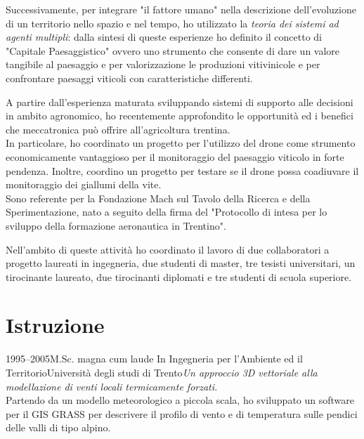 \documentclass{curriculum}
\begin{document}
\begin{description}[style= unboxed, leftmargin= 6 pt, topsep= -3 pt, parsep= 3 pt, itemsep= 2pt]
     Successivamente, per integrare "il fattore umano" nella descrizione dell'evoluzione di un territorio nello spazio e nel tempo, ho utilizzato la \textit{teoria dei sistemi ad agenti multipli}: dalla sintesi di queste esperienze ho definito il concetto  di "Capitale Paesaggistico" ovvero uno strumento che consente di dare un valore tangibile al paesaggio e per valorizzazione le produzioni vitivinicole e per confrontare paesaggi viticoli con caratteristiche differenti. 
     \item[Droni e agricoltura di precisione] A partire dall'esperienza maturata sviluppando sistemi di supporto alle decisioni in ambito agronomico, ho recentemente approfondito le opportunità ed i benefici che meccatronica può offrire all'agricoltura trentina.\\
     In particolare, ho coordinato un progetto per l'utilizzo del drone come strumento economicamente vantaggioso per il monitoraggio del paesaggio viticolo in forte pendenza. Inoltre, coordino un progetto per testare se il drone possa coadiuvare il monitoraggio dei giallumi della vite.\\
     Sono referente per la Fondazione Mach sul Tavolo della Ricerca e della Sperimentazione, nato a seguito della firma del "Protocollo di intesa per lo sviluppo della formazione aeronautica in Trentino".
    \end{description}
    \vspace{3pt}
    Nell'ambito di queste attività ho coordinato il lavoro di due collaboratori a progetto laureati in ingegneria, due studenti di master, tre tesisti universitari, un tirocinante laureato, due tirocinanti diplomati e tre studenti di scuola superiore.
    
    \newpage
    
    \section{Istruzione}
    \begin{entrylist}
    \entry
        {1995--2005}{M.Sc. magna cum laude {\normalfont In Ingegneria per l'Ambiente ed il Territorio}}{Università degli studi di Trento}{\emph{Un approccio 3D vettoriale alla modellazione di venti locali termicamente forzati.}\hfill\vspace{2pt}\\
        Partendo da un modello meteorologico a piccola scala, ho sviluppato un software per il GIS GRASS per descrivere il profilo di vento e di temperatura sulle pendici delle valli di tipo alpino.}
    \end{entrylist}
    
\end{document}
